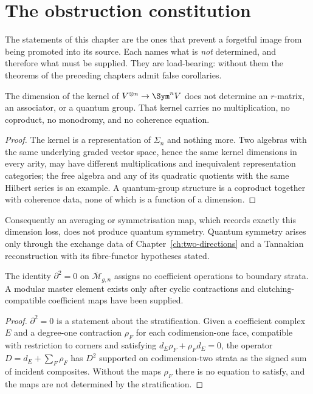 \chapter{The obstruction constitution}
\label{ch:no-go}

The statements of this chapter are the ones that prevent a forgetful image
from being promoted into its source. Each names what is \emph{not}
determined, and therefore what must be supplied. They are load-bearing:
without them the theorems of the preceding chapters admit false corollaries.

\begin{theorem}
\label{nogo:dimension-loss}
\StatusProved{} The dimension of the kernel of $V^{\otimes n}\to\Sym^nV$
does not determine an $r$-matrix, an associator, or a quantum group. That
kernel carries no multiplication, no coproduct, no monodromy, and no
coherence equation.
\end{theorem}

\begin{proof}
The kernel is a representation of $\Sigma_n$ and nothing more. Two
algebras with the same underlying graded vector space, hence the same
kernel dimensions in every arity, may have different multiplications and
inequivalent representation categories; the free algebra and any of its
quadratic quotients with the same Hilbert series is an example. A
quantum-group structure is a coproduct together with coherence data, none
of which is a function of a dimension.
\end{proof}

Consequently an averaging or symmetrisation map, which records exactly
this dimension loss, does not produce quantum symmetry. Quantum symmetry
arises only through the exchange data of Chapter~\ref{ch:two-directions}
and a Tannakian reconstruction with its fibre-functor hypotheses stated.

\begin{theorem}
\label{nogo:topology}
\StatusProved{} The identity $\partial^2=0$ on
$\overline{\mathcal M}_{g,n}$ assigns no coefficient operations to
boundary strata. A modular master element exists only after cyclic
contractions and clutching-compatible coefficient maps have been supplied.
\end{theorem}

\begin{proof}
$\partial^2=0$ is a statement about the stratification. Given a
coefficient complex $E$ and a degree-one contraction $\rho_F$ for each
codimension-one face, compatible with restriction to corners and
satisfying $d_E\rho_F+\rho_Fd_E=0$, the operator $D=d_E+\sum_F\rho_F$ has
$D^2$ supported on codimension-two strata as the signed sum of incident
composites. Without the maps $\rho_F$ there is no equation to satisfy, and
the maps are not determined by the stratification.
\end{proof}

